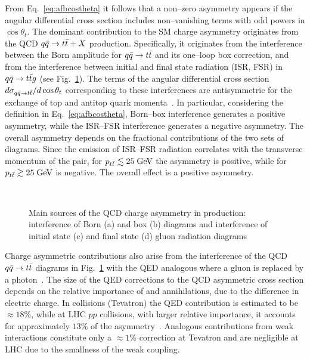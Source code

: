 From Eq.~\ref{eq:afbcostheta} it follows that a non--zero asymmetry
appears if the angular differential cross section includes
non--vanishing terms with odd powers in $\cos\theta_t$.
The dominant contribution to the SM charge asymmetry originates from
the QCD \mbox{$q\bar{q}{}\to t\bar{t}{}+X$} production. Specifically, it originates from the
interference between the Born amplitude for \mbox{$q\bar{q}{}\to t\bar{t}{}$} and
its one--loop box correction, and from the interference between initial and final
state radiation (ISR, FSR) in \mbox{$q\bar{q}{}\to{}t\bar{t}{}g$}
(see Fig.~\ref{fig:asymdiagrams}). The terms of the angular differential cross section
$d\sigma_{q\bar{q}{}\to{}t\bar{t}{}}/d\cos\theta_t$ corresponding to these
interferences are antisymmetric for the exchange of top and antitop
quark momenta~\cite{Kuhn:1998kw}. In particular, considering the
definition in Eq.~\ref{eq:afbcostheta}, Born--box interference
generates a positive asymmetry, while the ISR--FSR interference
generates a negative asymmetry.
The overall asymmetry depends on the fractional contributions of the two
sets of diagrams. Since the emission of ISR--FSR radiation correlates
with the transverse momentum \pttt{} of the \ttbar{} pair, for
$p_{t\bar{t}}{}\lesssim{}25\; \mathrm{GeV}{}$ the asymmetry is positive, while for
$p_{t\bar{t}}{}\gtrsim{}25\; \mathrm{GeV}{}$ is negative. The overall effect is a
positive asymmetry.
\begin{figure}[!htb]
  \centering
   \quad
   \\
   \quad
  \caption{Main sources of the QCD charge asymmetry in \ttbar{}
    production: interference of Born (a) and box (b) diagrams and
    interference of initial state (c) and final state (d) gluon
    radiation diagrams}
  \label{fig:asymdiagrams}
\end{figure}

Charge asymmetric contributions also arise from the interference of
the QCD \mbox{$q\bar{q}{}\to{}t\bar{t}{}$} diagrams in
Fig.~\ref{fig:asymdiagrams} with the QED analogous where a gluon is
replaced by a photon~\cite{Hollik:2011ps}. The size of the QED
corrections to the QCD asymmetric cross section depends on the
relative importance of \uubar{} and \ddbar{} annihilations, due to the
difference in electric charge.
In \ppbar{} collisions (Tevatron) the QED contribution is estimated to
be $\approx{}18\%$, while at LHC $pp$ collisions, with larger relative
\ddbar{} importance, it accounts for approximately $13\%$ of the
asymmetry~\cite{Kuhn:2011ri}.
Analogous contributions from weak interactions constitute only a
$\approx{}1\%$ correction at Tevatron and are negligible at LHC due to
the smallness of the weak coupling.

